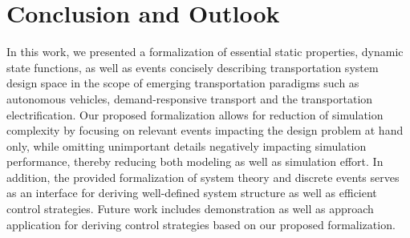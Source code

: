 \documentclass[graybox]{svmult}
\begin{document}
\vspace{-2mm}

\section{Conclusion and Outlook}
\label{sec:con}
In this work, we presented a formalization of essential static properties, dynamic state functions, as well as events concisely describing transportation system design space in the scope of emerging transportation paradigms such as autonomous vehicles, demand-responsive transport and the transportation electrification. Our proposed formalization allows for reduction of simulation complexity by focusing on relevant events impacting the design problem at hand only, while omitting unimportant details negatively impacting simulation performance, thereby reducing both modeling as well as simulation effort. In addition, the provided formalization of system theory and discrete events serves as an interface for deriving well-defined system structure as well as efficient control strategies. Future work includes demonstration as well as approach application for deriving control strategies based on our proposed formalization.

\newpage



\end{document}
